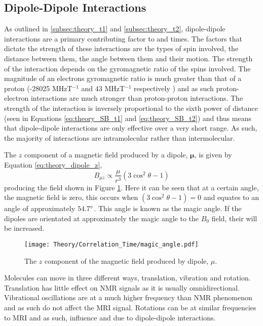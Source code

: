 \subsection{Dipole-Dipole Interactions}
\label{subsec:theory_dipole_dipole_interactions}
As outlined in \ref{subsec:theory_t1} and \ref{subsec:theory_t2}, dipole-dipole interactions are a primary contributing factor to \tone and \ttwo times. The factors that dictate the strength of these interactions are the types of spin involved, the distance between them, the angle between them and their motion. The strength of the interaction depends on the gyromagnetic ratio of the spins involved. The magnitude of an electrons gyromagnetic ratio is much greater than that of a proton (-28025 MHzT$^{-1}$ and 43 MHzT$^{-1}$ respectively \cite{mohr_codata_2016}) and as such proton-electron interactions are much stronger than proton-proton interactions. The strength of the interaction is inversely proportional to the sixth power of distance (seen in Equations \eqref{eq:theory_SB_t1} and \eqref{eq:theory_SB_t2}) and thus means that dipole-dipole interactions are only effective over a very short range. As such, the majority of interactions are intramolecular rather than intermolecular.

The $z$ component of a magnetic field produced by a dipole, $\bm{\mu}$, is given by Equation \ref{eq:theory_dipole_z},
\begin{equation}
	B_{\mu z} \propto \frac{\mu}{r^3}\left( 3\cos^2\theta -1\right) 
	\label{eq:theory_dipole_z}
\end{equation}
producing the field shown in Figure \ref{fig:theory_magic_angle}. Here it can be seen that at a certain angle, the magnetic field is zero, this occurs when $\left( 3\cos^2\theta -1\right) = 0$ and equates to an angle of approximately $54.7\degree$. This angle is known as the magic angle. If the dipoles are orientated at approximately the magic angle to the $B_0$ field, their \ttwo will be increased.


\begin{figure}[H]
	\centering
	\texttt{[image: Theory/Correlation\_Time/magic\_angle.pdf]}
	\caption{The $z$ component of the magnetic field produced by dipole, $\mu$.}
	\label{fig:theory_magic_angle}	
\end{figure}

Molecules can move in three different ways, translation, vibration and rotation. Translation has little effect on \ac{NMR} signals as it is usually omnidirectional. Vibrational oscillations are at a much higher frequency than \ac{NMR} phenomenon and as such do not affect the \ac{MRI} signal. Rotations can be at similar frequencies to \ac{MRI} and as such, influence \tone and \ttwo due to dipole-dipole interactions.

